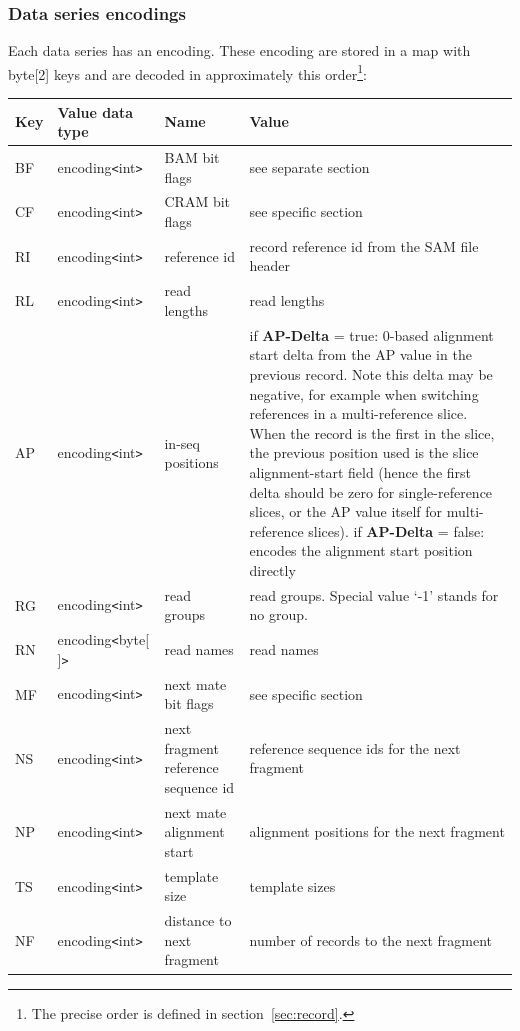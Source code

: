 \documentclass[a4paper]{article}
\begin{document}
\subsubsection*{Data series encodings}

Each data series has an encoding. These encoding are stored in a map with byte[2] 
keys and are decoded in approximately this order\footnote{The precise order is defined in section~\ref{sec:record}.}:

\begin{threeparttable}[t]
\begin{tabular}{|l|l|>{\raggedright}p{100pt}|>{\raggedright}p{220pt}|}
\hline
\textbf{Key} & \textbf{Value data type} & \textbf{Name} & \textbf{Value}\tabularnewline
\hline
BF & encoding\texttt{<}int\texttt{>} & BAM bit flags & see separate section\tabularnewline
\hline
CF & encoding\texttt{<}int\texttt{>} & CRAM bit flags & see specific section\tabularnewline
\hline
RI & encoding\texttt{<}int\texttt{>} & reference id & record reference id from
the SAM file header\tabularnewline
\hline
RL & encoding\texttt{<}int\texttt{>} & read lengths & read lengths\tabularnewline
\hline
AP & encoding\texttt{<}int\texttt{>} & in-seq positions & if \textbf{AP-Delta} = true: 0-based alignment start
delta from the AP value in the previous record.
Note this delta may be negative, for example when switching references in a multi-reference slice.
When the record is the first in the slice, the previous position used is the slice alignment-start field (hence the first delta should be zero for single-reference slices, or the AP value itself for multi-reference slices).  \linebreak{}
if \textbf{AP-Delta} = false: encodes the alignment start position directly\tabularnewline
\hline
RG & encoding\texttt{<}int\texttt{>} & read groups & read groups. Special value 
`-1' stands for no group.\tabularnewline
\hline
RN\tnote{a} & encoding\texttt{<}byte[ ]\texttt{>} & read names & read names\tabularnewline
\hline
MF & encoding\texttt{<}int\texttt{>} & next mate bit flags & see specific section\tabularnewline
\hline
NS & encoding\texttt{<}int\texttt{>} & next fragment reference sequence id & reference 
sequence ids for the next fragment \tabularnewline
\hline
NP & encoding\texttt{<}int\texttt{>} & next mate alignment start & alignment positions 
for the next fragment\tabularnewline
\hline
TS & encoding\texttt{<}int\texttt{>} & template size & template sizes\tabularnewline
\hline
NF & encoding\texttt{<}int\texttt{>} & distance to next fragment & number of records
to the next fragment\tnote{b}\tabularnewline

\end{tabular}
\end{threeparttable}
\end{document}
